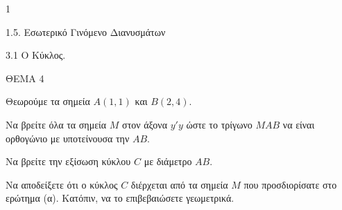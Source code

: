 \begin{ylh}{1}
    \item 1.5. Εσωτερικό Γινόμενο Διανυσμάτων
    \item 3.1 Ο Κύκλος.
\end{ylh}
ΘΕΜΑ 4

Θεωρούμε τα σημεία $A(1, 1)$ και $B(2, 4)$.
\begin{alist}
\item Να βρείτε όλα τα σημεία $M$ στον άξονα $y'y$ ώστε το τρίγωνο $MAB$ να είναι ορθογώνιο με υποτείνουσα την $AB$. 
\item Να βρείτε την εξίσωση κύκλου $C$ με διάμετρο $AB$. 
\item Να αποδείξετε ότι ο κύκλος $C$ διέρχεται από τα σημεία $M$ που προσδιορίσατε στο ερώτημα (α). Κατόπιν, να το επιβεβαιώσετε γεωμετρικά. 
\end{alist}